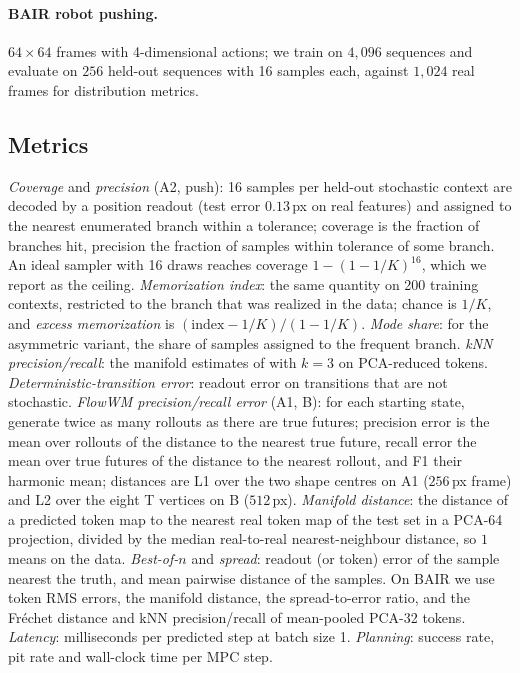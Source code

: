 \paragraph{BAIR robot pushing.}
$64\times64$ frames with 4-dimensional actions; we train on $4{,}096$ sequences and evaluate on $256$ held-out sequences with 16 samples each, against $1{,}024$ real frames for distribution metrics.

\subsection{Metrics}
\label{sec:metrics}
\emph{Coverage} and \emph{precision} (A2, push): 16 samples per held-out stochastic context are decoded by a position readout (test error $0.13$\,px on real features) and assigned to the nearest enumerated branch within a tolerance; coverage is the fraction of branches hit, precision the fraction of samples within tolerance of some branch. An ideal sampler with 16 draws reaches coverage $1 - (1-1/K)^{16}$, which we report as the ceiling. \emph{Memorization index}: the same quantity on 200 training contexts, restricted to the branch that was realized in the data; chance is $1/K$, and \emph{excess memorization} is $(\text{index} - 1/K)/(1 - 1/K)$. \emph{Mode share}: for the asymmetric variant, the share of samples assigned to the frequent branch. \emph{kNN precision/recall}: the manifold estimates of \citet{kynkaanniemi2019improved} with $k{=}3$ on PCA-reduced tokens. \emph{Deterministic-transition error}: readout error on transitions that are not stochastic. \emph{FlowWM precision/recall error} (A1, B): for each starting state, generate twice as many rollouts as there are true futures; precision error is the mean over rollouts of the distance to the nearest true future, recall error the mean over true futures of the distance to the nearest rollout, and F1 their harmonic mean; distances are L1 over the two shape centres on A1 ($256$\,px frame) and L2 over the eight T vertices on B ($512$\,px). \emph{Manifold distance}: the distance of a predicted token map to the nearest real token map of the test set in a PCA-64 projection, divided by the median real-to-real nearest-neighbour distance, so $1$ means on the data. \emph{Best-of-$n$} and \emph{spread}: readout (or token) error of the sample nearest the truth, and mean pairwise distance of the samples. On BAIR we use token RMS errors, the manifold distance, the spread-to-error ratio, and the Fr\'echet distance and kNN precision/recall of mean-pooled PCA-32 tokens. \emph{Latency}: milliseconds per predicted step at batch size 1. \emph{Planning}: success rate, pit rate and wall-clock time per MPC step.

